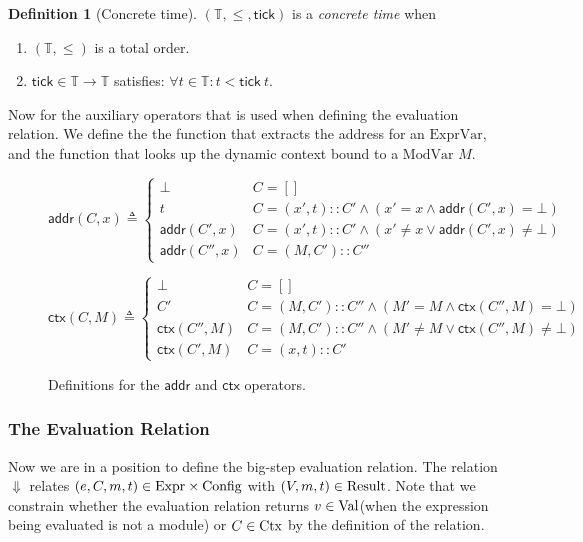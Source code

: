 \documentclass[acmsmall,screen,review]{acmart}
\theoremstyle{definition}
\newtheorem{definition}{Definition}[section]
\newcommand*{\cons}{::}
\newcommand*{\Expr}{\text{Expr}}
\newcommand*{\ExprVar}{\text{ExprVar}}
\newcommand*{\ModVar}{\text{ModVar}}
\newcommand*{\Time}{\mathbb{T}}
\newcommand*{\Ctx}[1]{\text{Ctx}\vphantom{#1}}
\newcommand*{\Value}[1]{\text{Val}\vphantom{#1}}
\newcommand*{\mem}{m}
\newcommand*{\Config}[1]{\text{Config}\vphantom{#1}}
\newcommand*{\Result}[1]{\text{Result}\vphantom{#1}}
\newcommand*{\addr}{\mathsf{addr}}
\newcommand*{\tick}{\mathsf{tick}}
\newcommand*{\modctx}{\mathsf{ctx}}
\begin{document}
\begin{definition}[Concrete time]
  $(\Time, \le, \tick)$ is a \emph{concrete time} when
  \begin{enumerate}
    \item $(\Time, \le)$ is a total order.
    \item $\tick\in\Time\rightarrow\Time$ satisfies: $\forall t\in\Time: t < \tick\:t$.
  \end{enumerate}
\end{definition}

Now for the auxiliary operators that is used when defining the evaluation relation.
We define the the function that extracts the address for an $\ExprVar$,
and the function that looks up the dynamic context bound to a $\ModVar$ $M$.

\begin{figure}[h!]
  \centering
  \footnotesize
  \[
    \addr(C,x)\triangleq
    \begin{cases}
      \bot         & C=[]                                                        \\
      t            & C=(x', t)\cons C' \wedge (x'= x\wedge \addr(C',x)=\bot)     \\
      \addr(C',x)  & C=(x', t)\cons C' \wedge (x'\neq x\lor \addr(C',x)\neq\bot) \\
      \addr(C'',x) & C=(M, C')\cons C''
    \end{cases}
  \]

  \[
    \modctx(C,M)\triangleq
    \begin{cases}
      \bot           & C=[]                                                          \\
      C'             & C=(M, C')\cons C''\wedge (M'= M\wedge\modctx(C'',M)=\bot)     \\
      \modctx(C'',M) & C=(M, C')\cons C''\wedge (M'\neq M\lor\modctx(C'',M)\neq\bot) \\
      \modctx(C',M)  & C=(x, t)\cons C'
    \end{cases}
  \]
  \caption{Definitions for the $\addr$ and $\modctx$ operators.}
\end{figure}

\subsubsection{The Evaluation Relation}

Now we are in a position to define the big-step evaluation relation.
The relation $\Downarrow$ relates $(e,C,\mem,t)\in\Expr\times\Config{\Time}$ with
$(V,\mem,t)\in\Result{\Time}$.
Note that we constrain whether the evaluation relation returns $v\in\Value{\Time}$(when the expression being evaluated is not a module) or $C\in\Ctx{\Time}$ by the definition of the relation.
\end{document}
